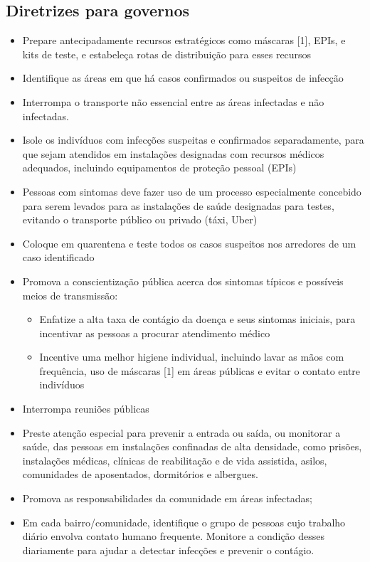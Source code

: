 \documentclass[onecolumn,journal]{IEEEtran}
\begin{document}
\begin{multicols}{2}
\section*{Diretrizes para governos}
\begin{itemize}
\item Prepare antecipadamente recursos estratégicos como máscaras [1], EPIs, e kits de teste, e estabeleça rotas de distribuição para esses recursos
\item Identifique as áreas em que há casos confirmados ou suspeitos de infecção
\item Interrompa o transporte não essencial entre as áreas infectadas e não infectadas.
\item Isole os indivíduos com infecções suspeitas e confirmados separadamente, para que sejam atendidos em instalações designadas com recursos médicos adequados, incluindo equipamentos de proteção pessoal (EPIs)
\item Pessoas com sintomas deve fazer uso de um processo especialmente concebido para serem levados para as instalações de saúde designadas para testes, evitando o transporte público ou privado (táxi, Uber)
\item Coloque em quarentena e teste todos os casos suspeitos nos arredores de um caso identificado
\item Promova a conscientização pública acerca dos sintomas típicos e possíveis meios de transmissão:
  \begin{itemize}
  \item Enfatize a alta taxa de contágio da doença e seus sintomas iniciais, para incentivar as pessoas a procurar atendimento médico
  \item Incentive uma melhor higiene individual, incluindo lavar as mãos com frequência, uso de máscaras [1] em áreas públicas e evitar o contato entre indivíduos
  \end{itemize}
\item Interrompa reuniões públicas
\item Preste atenção especial para prevenir a entrada ou saída, ou monitorar a saúde, das pessoas em instalações confinadas de alta densidade, como prisões, instalações médicas, clínicas de reabilitação e de vida assistida, asilos, comunidades de aposentados, dormitórios e albergues.
\item Promova as responsabilidades da comunidade em áreas infectadas;
\item Em cada bairro/comunidade, identifique o grupo de pessoas cujo trabalho diário envolva contato humano frequente. Monitore a condição desses diariamente para ajudar a detectar infecções e prevenir o contágio.

\end{itemize}
\end{multicols}
\end{document}
